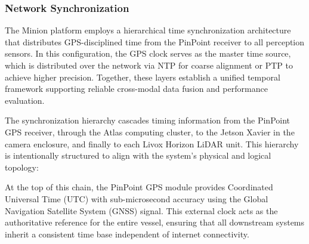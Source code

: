 \documentclass[../main.tex]{subfiles}
\begin{document}

\subsubsection{Network Synchronization} \label{time_sync_lan}

The Minion platform employs a hierarchical time synchronization architecture that distributes GPS-disciplined time from the PinPoint receiver to all perception sensors.
In this configuration, the GPS clock serves as the master time source, which is distributed over the network via \ac{NTP} for coarse alignment or \ac{PTP} to achieve higher precision.
Together, these layers establish a unified temporal framework supporting reliable cross-modal data fusion and performance evaluation.

The synchronization hierarchy cascades timing information from the PinPoint GPS receiver, through the Atlas computing cluster, to the Jetson Xavier in the camera enclosure, and finally to each Livox Horizon LiDAR unit. This hierarchy is intentionally structured to align with the system’s physical and logical topology:


At the top of this chain, the PinPoint GPS module provides Coordinated Universal Time (UTC) with sub-microsecond accuracy using the Global Navigation Satellite System (GNSS) signal. This external clock acts as the authoritative reference for the entire vessel, ensuring that all downstream systems inherit a consistent time base independent of internet connectivity.
\end{document}
